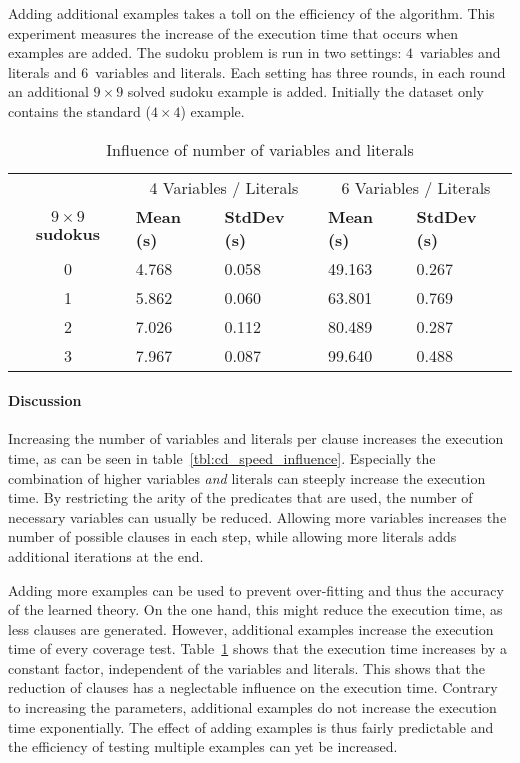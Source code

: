 \begin{experiment}
	Adding additional examples takes a toll on the efficiency of the algorithm.
	This experiment measures the increase of the execution time that occurs when examples are added.
	The sudoku problem is run in two settings: $4$~variables and literals and $6$~variables and literals.
	Each setting has three rounds, in each round an additional $9 \times 9$ solved sudoku example is added.
	Initially the dataset only contains the standard ($4 \times 4$) example.

	\begin{table}[!htp]
		\begin{tabularx}{\textwidth}{c|XX|XX}
			& \multicolumn{2}{c}{4 Variables / Literals} & \multicolumn{2}{c}{6 Variables / Literals} \\
			\textbf{$9 \times 9$ sudokus}	& \textbf{Mean (s)} & \textbf{StdDev (s)} & \textbf{Mean (s)} & \textbf{StdDev (s)} \\
			\toprule
			0 & 4.768 & 0.058	& 49.163	& 0.267	\\
			1 & 5.862 & 0.060	& 63.801	& 0.769	\\
			2 & 7.026 & 0.112	& 80.489	& 0.287	\\
			3 & 7.967 & 0.087	& 99.640	& 0.488	\\
		\end{tabularx}
		\caption{Influence of number of variables and literals}
		\label{tbl:cd_speed_examples}
	\end{table}
\end{experiment}

\paragraph{Discussion}
Increasing the number of variables and literals per clause increases the execution time, as can be seen in table~\ref{tbl:cd_speed_influence}.
Especially the combination of higher variables \emph{and} literals can steeply increase the execution time.
By restricting the arity of the predicates that are used, the number of necessary variables can usually be reduced.
Allowing more variables increases the number of possible clauses in each step, while allowing more literals adds additional iterations at the end.

Adding more examples can be used to prevent over-fitting and thus the accuracy of the learned theory.
On the one hand, this might reduce the execution time, as less clauses are generated.
However, additional examples increase the execution time of every coverage test.
Table~\ref{tbl:cd_speed_examples} shows that the execution time increases by a constant factor, independent of the variables and literals.
This shows that the reduction of clauses has a neglectable influence on the execution time.
Contrary to increasing the parameters, additional examples do not increase the execution time exponentially.
The effect of adding examples is thus fairly predictable and the efficiency of testing multiple examples can yet be increased.

